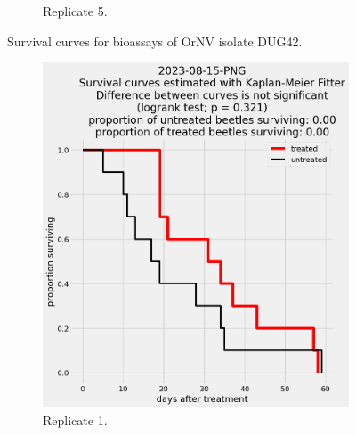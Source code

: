 \documentclass[12pt,letterpaper,english,bibliography=totocnumbered, abstract=on]{scrartcl}
\begin{document}
\begin{figure}[h]
\begin{subfigure}{.3\textwidth}
		\caption{Replicate 5.}
	\end{subfigure}
	\caption{Survival curves for bioassays of OrNV isolate DUG42.}
	\label{fig:DUG42 survival curves}
\end{figure}


\begin{figure}[h]
	\centering
	\begin{subfigure}{.3\textwidth}
		\includegraphics[width=\linewidth]{images/survival_curves/2023-08-15-PNG}
		\caption{Replicate 1.}
	\end{subfigure}
	\begin{subfigure}{.3\textwidth}

\end{subfigure}
\end{figure}
\end{document}
